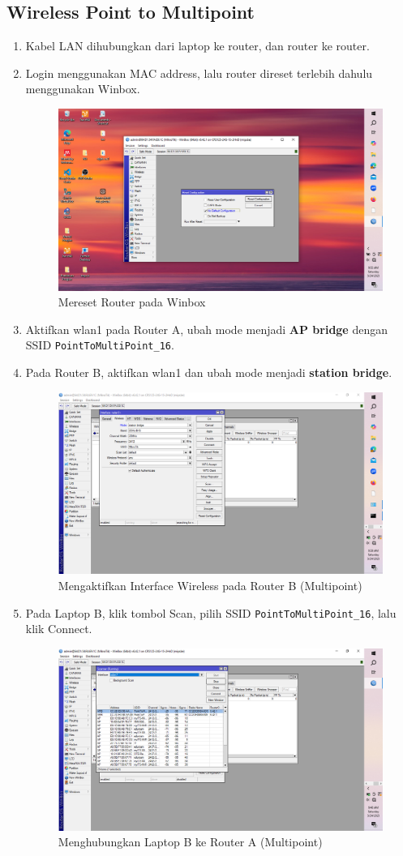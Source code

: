 \subsection{Wireless Point to Multipoint}
\begin{enumerate}
    \item Kabel LAN dihubungkan dari laptop ke router, dan router ke router.
    \item Login menggunakan MAC address, lalu router direset terlebih dahulu menggunakan Winbox.
    \begin{figure}[H]
        \centering
        \includegraphics[width=0.5\linewidth]{gambar1.png}
        \caption{Mereset Router pada Winbox}
        \label{fig:reset-router-multi}
    \end{figure}

    \item Aktifkan wlan1 pada Router A, ubah mode menjadi \textbf{AP bridge} dengan SSID \texttt{PointToMultiPoint\_16}.
 

    \item Pada Router B, aktifkan wlan1 dan ubah mode menjadi \textbf{station bridge}.
    \begin{figure}[H]
        \centering
        \includegraphics[width=0.5\linewidth]{gambar3ma.png}
        \caption{Mengaktifkan Interface Wireless pada Router B (Multipoint)}
        \label{fig:aktif-wlan-b-multi}
    \end{figure}

    \item Pada Laptop B, klik tombol Scan, pilih SSID \texttt{PointToMultiPoint\_16}, lalu klik Connect.
    \begin{figure}[H]
        \centering
        \includegraphics[width=0.5\linewidth]{gambar3m.png}
        \caption{Menghubungkan Laptop B ke Router A (Multipoint)}
        \label{fig:hubungkan-laptop-multi}
    \end{figure}


\end{enumerate}
